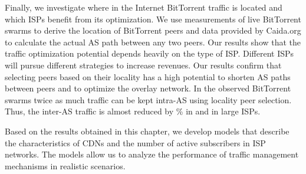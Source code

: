 Finally, we investigate where in the Internet BitTorrent traffic is located and which ISPs benefit from its optimization. We use measurements of live BitTorrent swarms to derive the location of BitTorrent peers and data provided by Caida.org to calculate the actual AS path between any two peers.
Our results show that the traffic optimization potential depends heavily on the type of ISP.
Different ISPs will pursue different strategies to increase revenues.
Our results confirm that selecting peers based on their locality has a high potential to shorten AS paths between peers and to optimize the overlay network. In the observed BitTorrent swarms twice as much traffic can be kept intra-AS using locality peer selection. Thus, the inter-AS traffic is almost reduced by \unit[50]{\%} in \tier and in large ISPs.

Based on the results obtained in this chapter, we develop models that describe the characteristics of CDNs and the number of active subscribers in ISP networks.
The models allow us to analyze the performance of traffic management mechanisms in realistic scenarios.

